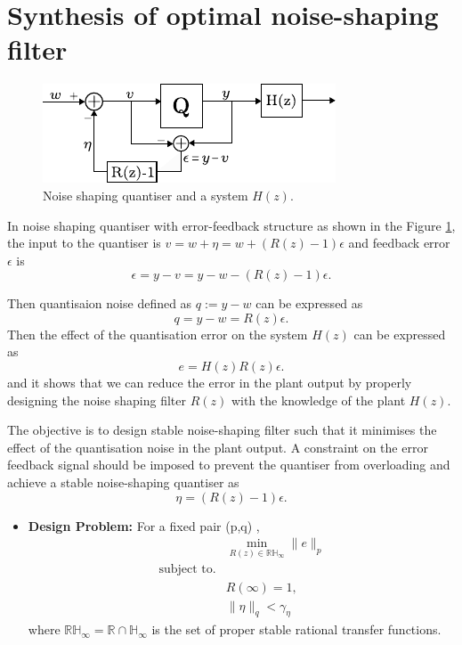 \documentclass[a4paper]{article}
\begin{document}
\newpage
\section{Synthesis of optimal noise-shaping filter}

\begin{figure}[!h]
	\centering
	\includegraphics[scale = 2]{figures/nsq_error_feedback.pdf}
	\caption{Noise shaping quantiser and a system $H(z)$.}
	\label{fig:nsq_efs}
\end{figure}
In noise shaping quantiser with error-feedback structure as shown in the Figure \ref{fig:nsq_efs}, the input to the quantiser is  $v = w + \eta = w + (R(z)-1)\epsilon$
and  feedback error $\epsilon$ is 
\begin{equation}
	\epsilon = y - v = y - w - (R(z)-1)\epsilon.
\end{equation}

Then quantisaion noise defined as $q := y - w$ can be expressed as 
\begin{equation}
	 q = y - w = R(z) \epsilon.
\end{equation}
Then the effect of the quantisation error on the system $H(z)$ can be expressed as 
\begin{equation}	
	 e = H(z) R(z) \epsilon.
	 \label{eq:err_plant}
\end{equation}
and it shows that we can reduce the error in the plant output by properly designing the noise shaping filter $R(z)$ with the knowledge of the plant $H(z)$. 

The objective is to design stable noise-shaping filter such that it minimises the effect of the quantisation noise in the plant output. A constraint on the error feedback signal should be imposed to prevent the quantiser from overloading and achieve a stable noise-shaping quantiser as $$ \eta = (R(z) - 1) \epsilon.$$

\begin{itemize}
	\item \textbf{Design Problem:} For a fixed pair (p,q) \cite{Shuichi2017}, 
	\begin{equation}
		\begin{aligned}
			&\min_{R(z) \in \mathbb{RH}_{\infty}} \| e \|_{p}  \\
			\textrm{subject  to.}& \\
			& R(\infty)	 = 1, \\
			& \|\eta\|_{q} < \gamma_{\eta}
		\end{aligned}	
	\end{equation}	
	where $\mathbb{RH}_{\infty} = \mathbb{R} \cap \mathbb{H}_{\infty}$ is the set of proper stable rational transfer functions.
\end{itemize}
\end{document}
